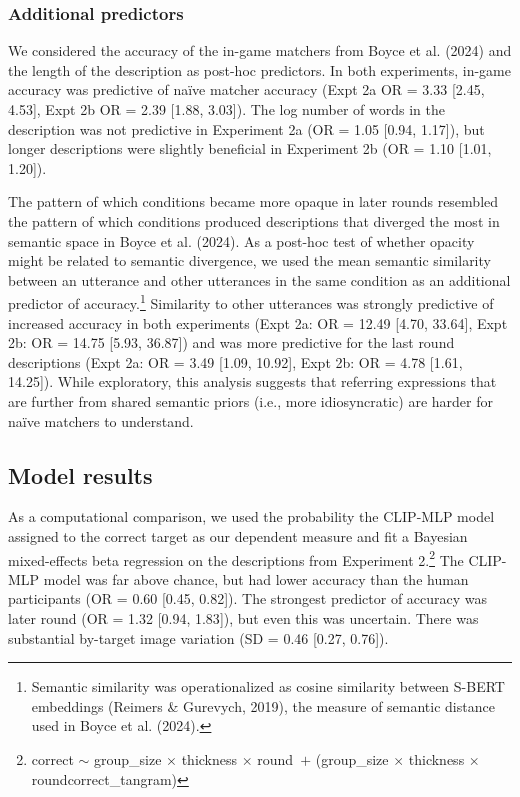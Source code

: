 \documentclass[10pt, letterpaper]{article}
\begin{document}
\subsubsection{Additional predictors}\label{additional-predictors}

We considered the accuracy of the in-game matchers from Boyce et al.
(2024) and the length of the description as post-hoc predictors. In both
experiments, in-game accuracy was predictive of naïve matcher accuracy
(Expt 2a OR = 3.33 {[}2.45, 4.53{]}, Expt 2b OR = 2.39 {[}1.88,
3.03{]}). The log number of words in the description was not predictive
in Experiment 2a (OR = 1.05 {[}0.94, 1.17{]}), but longer descriptions
were slightly beneficial in Experiment 2b (OR = 1.10 {[}1.01, 1.20{]}).

The pattern of which conditions became more opaque in later rounds
resembled the pattern of which conditions produced descriptions that
diverged the most in semantic space in Boyce et al. (2024). As a
post-hoc test of whether opacity might be related to semantic
divergence, we used the mean semantic similarity between an utterance
and other utterances in the same condition as an additional predictor of
accuracy.\footnote{Semantic similarity was operationalized as cosine
  similarity between S-BERT embeddings (Reimers \& Gurevych, 2019), the
  measure of semantic distance used in Boyce et al. (2024).} Similarity
to other utterances was strongly predictive of increased accuracy in
both experiments (Expt 2a: OR = 12.49 {[}4.70, 33.64{]}, Expt 2b: OR =
14.75 {[}5.93, 36.87{]}) and was more predictive for the last round
descriptions (Expt 2a: OR = 3.49 {[}1.09, 10.92{]}, Expt 2b: OR = 4.78
{[}1.61, 14.25{]}). While exploratory, this analysis suggests that
referring expressions that are further from shared semantic priors
(i.e., more idiosyncratic) are harder for naïve matchers to understand.

\subsection{Model results}\label{model-results}

As a computational comparison, we used the probability the CLIP-MLP
model assigned to the correct target as our dependent measure and fit a
Bayesian mixed-effects beta regression on the descriptions from
Experiment 2.\footnote{correct \({\sim}\) group\_size \({\times}\)
  thickness \({\times}\) round~\({+}\) (group\_size \({\times}\)
  thickness \({\times}\) round\textbar correct\_tangram)} The CLIP-MLP
model was far above chance, but had lower accuracy than the human
participants (OR = 0.60 {[}0.45, 0.82{]}). The strongest predictor of
accuracy was later round (OR = 1.32 {[}0.94, 1.83{]}), but even this was
uncertain. There was substantial by-target image variation (SD = 0.46
{[}0.27, 0.76{]}).
\end{document}
